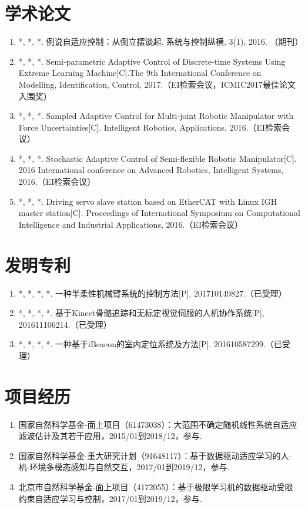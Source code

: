 
\begin{publications}{99}
\section*{学术论文}
\begin{enumerate}%
\item *, *, *. 例说自适应控制：从倒立摆谈起. 系统与控制纵横, 3(1), 2016. （期刊）
\item *, *, *. Semi-parametric Adaptive Control of Discrete-time Systems Using Extreme Learning Machine[C].The 9th International Conference on Modelling, Identification, Control, 2017.（EI检索会议，ICMIC2017最佳论文入围奖）
\item *, *, *. Sampled Adaptive Control for Multi-joint Robotic Manipulator with Force Uncertainties[C]. Intelligent Robotics, Applications, 2016.（EI检索会议）
\item *, *, *. Stochastic Adaptive Control of Semi-flexible Robotic Manipulator[C]. 2016 International conference on Advanced Robotics, Intelligent Systems, 2016.（EI检索会议）
\item *, *, *. Driving servo slave station based on EtherCAT with Linux IGH master station[C]. Proceedings of International Symposium on Computational Intelligence and Industrial Applications, 2016.（EI检索会议）
\end{enumerate}

\section*{发明专利}
\begin{enumerate}%
\item *, *, *, *. 一种半柔性机械臂系统的控制方法[P], 201710149827.（已受理）
\item *, *, *, *. 基于Kinect骨骼追踪和无标定视觉伺服的人机协作系统[P], 201611106214.（已受理）
\item *, *, *, *. 一种基于iBeacon的室内定位系统及方法[P], 201610587299.（已受理）
\end{enumerate}

\section*{项目经历}
\begin{enumerate}
\item 国家自然科学基金-面上项目（61473038）：大范围不确定随机线性系统自适应滤波估计及其若干应用，2015/01到2018/12，参与.
\item 国家自然科学基金-重大研究计划（91648117）：基于数据驱动适应学习的人-机-环境多模态感知与自然交互，2017/01到2019/12，参与.
\item 北京市自然科学基金-面上项目（4172055）：基于极限学习机的数据驱动受限约束自适应学习与控制，2017/01到2019/12，参与.
\end{enumerate}
\end{publications}

